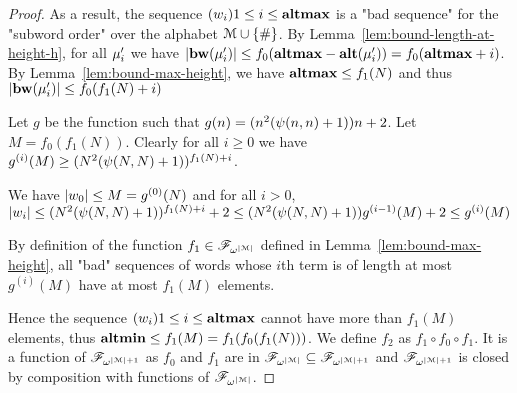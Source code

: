 \begin{proof}
	As a result, the sequence $(w_i){1\leq i \leq \mathbf{altmax}}$ is a "bad sequence" for the "subword order" over the alphabet $\mathcal{M}\cup\{\#\}$.
	By Lemma~\ref{lem:bound-length-at-height-h}, for all $\mu'_i$ we have $|\mathbf{bw}(\mu'_i)| \leq f_0(\mathbf{altmax} - \mathbf{alt}(\mu'_i)) = f_0(\mathbf{altmax} +i)$.
	By Lemma~\ref{lem:bound-max-height}, we have $\mathbf{altmax} \leq f_1(N)$ and thus $|\mathbf{bw}(\mu'_i)| \leq  f_0(f_1(N) +i)$
	
	Let $g$ be the function such that $g(n) = (n^2(\psi(n,n)+1))n+2$. 
	Let $M = f_0(f_1(N))$. Clearly for all $i\geq 0$ we have $g^{(i)}(M) \geq (N^2(\psi(N,N)+1))^{f_1(N) + i}$.
	
	We have $|w_0| \leq M = g^{(0)}(N)$ and for all $i>0$, $|w_i| \leq (N^2(\psi(N,N)+1))^{f_1(N) + i} + 2 \leq (N^2(\psi(N,N)+1)) g^{(i-1)}(M) + 2 \leq g^{(i)}(M)$
	
	By definition of the function $f_1 \in \mathscr{F}_{\omega^{|\mathcal{M}|}}$ defined in Lemma~\ref{lem:bound-max-height}, all "bad" sequences of words whose $i$th term is of length at most $g^{(i)}(M)$ have at most $f_1(M)$ elements.
	
	Hence the sequence $(w_i){1\leq i \leq \mathbf{altmax}}$ cannot have more than $f_1(M)$ elements, thus $\mathbf{altmin} \leq f_1(M) = f_1(f_0(f_1(N)))$.
	We define $f_2$ as $f_1 \circ f_0 \circ f_1$. It is a function of $\mathscr{F}_{\omega^{|\mathcal{M}|+1}}$ as $f_0$ and $f_1$ are in $\mathscr{F}_{\omega^{|\mathcal{M}|}} \subseteq \mathscr{F}_{\omega^{|\mathcal{M}|+1}}$ and $\mathscr{F}_{\omega^{|\mathcal{M}|+1}}$ is closed by composition with functions of $\mathscr{F}_{\omega^{|\mathcal{M}|}}$.
\end{proof}

\PropBoundTreeSize*

